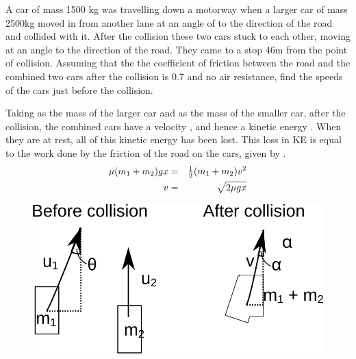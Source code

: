 
\begin{problem} 
{A car of mass 1500 kg was travelling down a motorway when a larger car of mass 2500kg moved in from another lane at an angle of  to the direction of the road and collided with it. After the collision these two cars stuck to each other, moving at an angle  to the direction of the road. They came to a stop 46m from the point of collision. Assuming that the the coefficient of friction between the road and the combined two cars after the collision is 0.7 and no air resistance, find the speeds of the  cars just before the collision.
}
{}
{Taking  as the mass of the larger car and  as the mass of the smaller car, after the collision, the combined cars have a velocity , and hence a kinetic energy . When they are at rest, all of this kinetic energy has been lost. This loss in KE is equal to the work done by the friction of the road on the cars, given by .
\begin{eqnarray} 
\mu (m_1+m_2)gx &=& {\textstyle \frac{1}{2}} (m_1+m_2) v^2 \\
v &=& \sqrt{2\mu gx} 
\end{eqnarray}

\begin{figure}[h]
\centering
\includegraphics[width=1.0\textwidth]{../../../figures/dynamics_l6_car_collision.svg}
\caption{}\label{fig:dynamics_l6_car_collision}
\end{figure}


}
\end{problem}

